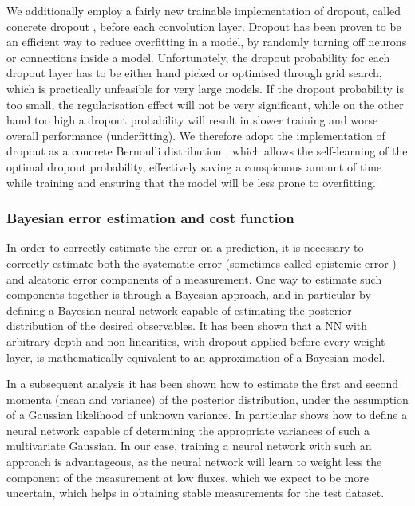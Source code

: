 We additionally employ a fairly new trainable implementation of dropout, called concrete dropout \cite{concrete-dropout}, before each convolution layer.
Dropout \cite{dropout} has been proven to be an efficient way to reduce overfitting in a model, by randomly turning off neurons or connections inside a model. Unfortunately, the dropout probability for each dropout layer has to be either hand picked or optimised through grid search, which is practically unfeasible for very large models. If the dropout probability is too small, the regularisation effect will not be very significant, while on the other hand too high a dropout probability will result in slower training and worse overall performance (underfitting). 
We therefore adopt the implementation of dropout as a concrete Bernoulli distribution \cite{concrete-distribution}, which allows the self-learning of the optimal dropout probability, effectively saving a conspicuous amount of time while training and ensuring that the model will be less prone to overfitting. 




\subsubsection{Bayesian error estimation and cost function}
\label{sec:bayesian-error}


In order to correctly estimate the error on a prediction, it is necessary to correctly estimate both the systematic error (sometimes called epistemic error \cite{epistemic-err}) and aleatoric error components of a measurement. One way to estimate such components together is through a Bayesian approach, and in particular by defining a Bayesian neural network capable of estimating the posterior distribution of the desired observables.   
It has been shown \cite{mcdropout} 
that a NN with arbitrary depth and  non-linearities, with dropout applied before every weight layer, is mathematically equivalent to an approximation of a Bayesian model. 

In a subsequent analysis \cite{heteroscedastic-error} it has been shown how to estimate the first and second momenta (mean and variance) of the posterior distribution, under the assumption of a Gaussian likelihood of unknown variance. In particular \cite{heteroscedastic-error} shows how to define a neural network capable of determining the appropriate variances of such a multivariate Gaussian.
In our case, training a neural network with such an approach is advantageous, as the neural network will learn to weight less the component of the measurement at low fluxes, which we expect to be more uncertain, which helps in obtaining stable measurements for the test dataset. 

